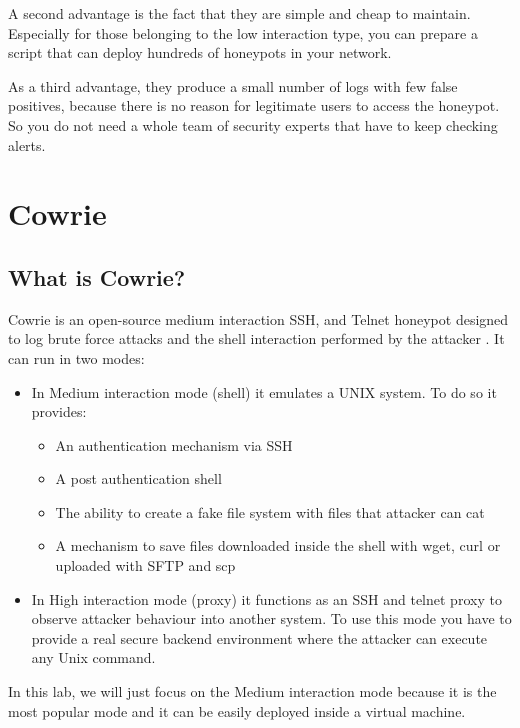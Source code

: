 \documentclass[epsfig,a4paper,11pt,titlepage,oneside,openany]{book}
\begin{document}
A second advantage is the fact that they are simple and cheap  to maintain. Especially for those belonging to the low interaction type, you can prepare a script that can deploy hundreds of honeypots in your network.

As a third advantage, they produce a small number of logs with few false positives, because there is no reason for legitimate users to access the honeypot. So you do not need a whole team of security experts that have to keep checking alerts.

\chapter{Cowrie}

\section{What is Cowrie?}

Cowrie is an open-source medium interaction SSH, and Telnet honeypot designed to log brute force attacks and the shell interaction performed by the attacker \cite{whatcowrie}.
It can run in two modes:
\begin{itemize}
\itemsep0em 
\item In Medium interaction mode (shell) it emulates a UNIX system. To do so it provides:
	\begin{itemize}
	\itemsep0em 
	\item An authentication mechanism via SSH
	\item A  post authentication shell
	\item The ability to create a fake file system with files that attacker can cat
	\item A mechanism to save files downloaded inside the shell with wget, curl or uploaded with SFTP and scp
	\end{itemize}
\item In High interaction mode (proxy) it functions as an SSH and telnet proxy to observe attacker behaviour into another system. To use this mode you have to provide a real secure backend environment where the attacker can execute any Unix command.
\end{itemize}

\noindent In this lab, we will just focus on the Medium interaction mode because it is the most popular mode and it can be easily deployed inside a virtual machine.
\end{document}
